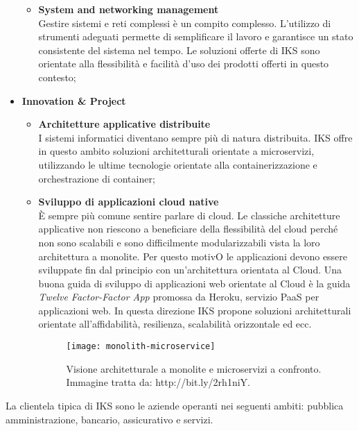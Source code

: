\begin{itemize}
\begin{itemize}
		\item \textbf{System and networking management}\\
		Gestire sistemi e reti complessi è un compito complesso. 
		L'utilizzo di strumenti adeguati permette di semplificare il 
		lavoro e garantisce un stato consistente del sistema nel tempo. 
		Le soluzioni offerte di IKS sono orientate alla flessibilità e 
		facilità d'uso dei prodotti offerti in questo contesto;
	\end{itemize} 
	\item \textbf{Innovation \& Project} \\
	\begin{itemize}
		\item \textbf{Architetture applicative distribuite}\\
		I sistemi informatici diventano sempre più di natura 
		distribuita. IKS offre in questo ambito soluzioni architetturali 
		orientate a microservizi, utilizzando le ultime tecnologie 
		orientate alla containerizzazione e orchestrazione di container; 
		
		\item \textbf{Sviluppo di applicazioni cloud native}\\
		È sempre più comune sentire parlare di cloud. Le classiche 
        architetture applicative non riescono a beneficiare della 
		flessibilità del cloud perché non sono scalabili e sono 
		difficilmente modularizzabili vista la loro architettura a 
        monolite. Per questo motivO le applicazioni devono essere 
		sviluppate fin dal principio con un'architettura orientata 
		al Cloud. Una buona guida di sviluppo di applicazioni web 
        orientate al Cloud è la guida \textit{Twelve Factor-Factor App}
		promossa da Heroku, servizio  PaaS per applicazioni web. In 
		questa direzione IKS propone soluzioni architetturali 
		orientate all'affidabilità, resilienza, scalabilità orizzontale 
		ed ecc.
		
		\begin{figure}[htbp]
			\begin{center}		
			\texttt{[image: monolith-microservice]}
			\caption{Visione architetturale a monolite e 
				microservizi a confronto. 
				Immagine tratta da: http://bit.ly/2rh1niY.}
			\end{center}
			\end{figure}
			\end{itemize} 
		\end{itemize}

La clientela tipica di IKS sono le aziende operanti nei seguenti ambiti: 
pubblica amministrazione, bancario, assicurativo e servizi. 

